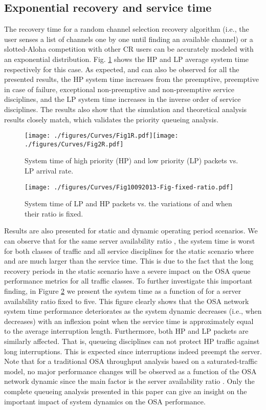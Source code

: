 \documentclass[11pt,journal,oneside,onecolumn,draftclsnofoot]{IEEEtran}
\begin{document}
\subsection{Exponential recovery and service time}
The recovery time for a random channel selection recovery algorithm (i.e., the user senses a list of channels one by one until finding an available channel) or a slotted-Aloha competition with other CR users can be accurately modeled with an exponential distribution. Fig. \ref{fig:32212-33212-D1-EE-LargeSmall} shows the HP and LP average system time respectively for this case.
As expected, and can also be observed for all the presented results, the HP system time increases from the preemptive, preemptive in case of failure, exceptional non-preemptive and non-preemptive service disciplines, and the LP system time increases in the inverse order of service disciplines. The results also show that the simulation and theoretical analysis results closely match, which validates the priority queueing analysis. 
\begin{figure}\texttt{[image: ./figures/Curves/Fig1R.pdf]}\texttt{[image: ./figures/Curves/Fig2R.pdf]}\caption{System time of high priority (HP) and low priority (LP) packets vs. LP arrival rate.}\label{fig:32212-33212-D1-EE-LargeSmall}\end{figure}
\begin{figure}\texttt{[image: ./figures/Curves/Fig10092013-Fig-fixed-ratio.pdf]}\caption{System time of LP and HP packets vs. the variations of  and  when their ratio is fixed.}\label{fig:Fig-fixed-ratio-10092013.pdf}\end{figure}

Results are also presented for static and dynamic operating period scenarios.  We can observe that for the same server availability ratio , the system time is worst for both classes of traffic and all service disciplines for the static scenario where  and  are much larger than the service time. This is due to the fact that the long recovery periods in the static scenario have a severe impact on the OSA queue performance metrics for all traffic classes. To further investigate this important finding, in Figure \ref{fig:Fig-fixed-ratio-10092013.pdf} we present the system time as a function of  for a server availability ratio   fixed to five.  This figure clearly shows that the OSA network system time performance deteriorates as the system dynamic decreases (i.e., when  decreases) with an inflexion point when the service time is approximately equal to the average interruption length. Furthermore, both HP and LP packets are similarly affected. That is, queueing disciplines can not protect HP traffic against long interruptions. This is expected since interruptions indeed preempt the server. Note that for a traditional OSA throughput analysis based on a saturated-traffic model, no major performance changes will be observed as a function of the OSA network dynamic since the main factor is the server availability ratio . Only the complete queueing analysis presented in this paper can give an insight on the important impact of system dynamics on the OSA performance.
\end{document}
